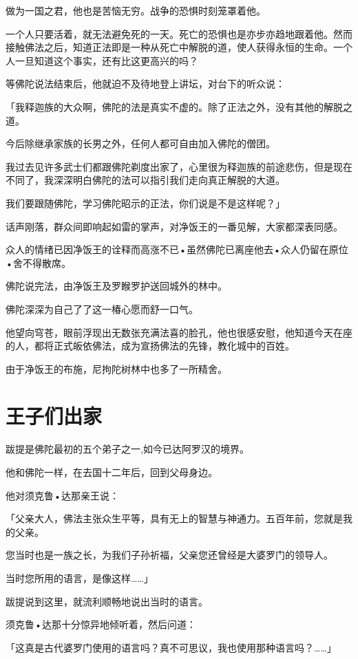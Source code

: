 \documentclass[twoside,openany]{book}
\begin{document}
做为一国之君，他也是苦恼无穷。战争的恐惧时刻笼罩着他。

一个人只要活着，就无法避免死的一天。死亡的恐惧也是亦步亦趋地跟着他。然而接触佛法之后，知道正法即是一种从死亡中解脱的道，使人获得永恒的生命。一个人一旦知道这个事实，还有比这更高兴的吗？

等佛陀说法结束后，他就迫不及待地登上讲坛，对台下的听众说：

「我释迦族的大众啊，佛陀的法是真实不虚的。除了正法之外，没有其他的解脱之道。

今后除继承家族的长男之外，任何人都可自由加入佛陀的僧团。

我过去见许多武士们都跟佛陀剃度出家了，心里很为释迦族的前途悲伤，但是现在不同了，我深深明白佛陀的法可以指引我们走向真正解脱的大道。

我们要跟随佛陀，学习佛陀昭示的正法，你们说是不是这样呢？」

话声刚落，群众间即响起如雷的掌声，对净饭王的一番见解，大家都深表同感。

众人的情绪已因净饭王的诠释而高涨不已•虽然佛陀已离座他去•众人仍留在原位•舍不得散席。

佛陀说完法，由净饭王及罗睺罗护送回城外的林中。

佛陀深深为自己了了这一椿心愿而舒一口气。

他望向穹苍，眼前浮现出无数张充满法喜的脸孔，他也很感安慰，他知道今天在座的人，都将正式皈依佛法，成为宣扬佛法的先锋，教化城中的百姓。

由于净饭王的布施，尼拘陀树林中也多了一所精舍。

\section{王子们出家}\label{sec8.5}

跋提是佛陀最初的五个弟子之一,如今已达阿罗汉的境界。

他和佛陀一样，在去国十二年后，回到父母身边。

他对须克鲁•达那亲王说：

「父亲大人，佛法主张众生平等，具有无上的智慧与神通力。五百年前，您就是我的父亲。

您当时也是一族之长，为我们子孙祈福，父亲您还曾经是大婆罗门的领导人。

当时您所用的语言，是像这样……」

跋提说到这里，就流利顺畅地说出当时的语言。

须克鲁•达那十分惊异地倾听着，然后问道：

「这真是古代婆罗门使用的语言吗？真不可思议，我也使用那种语言吗？……」
\end{document}
